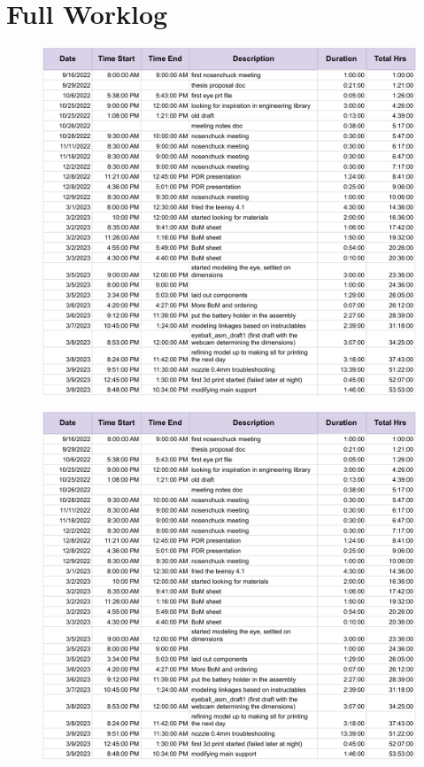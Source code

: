 \chapter{Full Worklog}
\label{ch:worklog}
\begin{figure}[h]
    \centering
    \includegraphics[page=1,width=\linewidth]{Thesis/appendix/Worklog for Writeup - Sheet1.pdf}
    \label{fig:worklog-1}
\end{figure}

\begin{figure}[h]
    \centering
    \includegraphics[page=2,width=\linewidth]{Thesis/appendix/Worklog for Writeup - Sheet1.pdf}
    \label{fig:worklog-2}
\end{figure}

